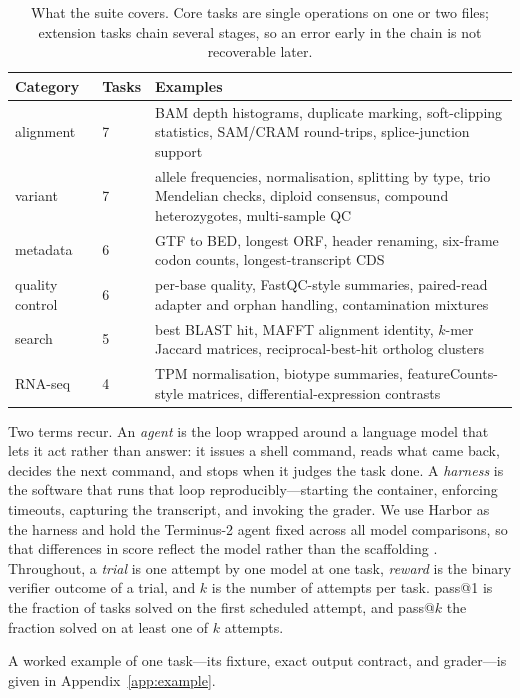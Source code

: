 \documentclass[11pt]{article}
\begin{document}
\begin{table}[tbp]
\centering
\small
\caption{What the suite covers. Core tasks are single operations on one or two files; extension tasks chain several stages, so an error early in the chain is not recoverable later.}
\label{tab:categories}
\begin{tabular}{llp{7.6cm}}
\toprule
Category & Tasks & Examples \\
\midrule
alignment & 7 & BAM depth histograms, duplicate marking, soft-clipping statistics, SAM/CRAM round-trips, splice-junction support \\
variant & 7 & allele frequencies, normalisation, splitting by type, trio Mendelian checks, diploid consensus, compound heterozygotes, multi-sample QC \\
metadata & 6 & GTF to BED, longest ORF, header renaming, six-frame codon counts, longest-transcript CDS \\
quality control & 6 & per-base quality, FastQC-style summaries, paired-read adapter and orphan handling, contamination mixtures \\
search & 5 & best BLAST hit, MAFFT alignment identity, $k$-mer Jaccard matrices, reciprocal-best-hit ortholog clusters \\
RNA-seq & 4 & TPM normalisation, biotype summaries, featureCounts-style matrices, differential-expression contrasts \\
\bottomrule
\end{tabular}
\end{table}

Two terms recur.
An \emph{agent} is the loop wrapped around a language model that lets it act rather than answer: it issues a shell command, reads what came back, decides the next command, and stops when it judges the task done.
A \emph{harness} is the software that runs that loop reproducibly---starting the container, enforcing timeouts, capturing the transcript, and invoking the grader.
We use Harbor as the harness and hold the Terminus-2 agent fixed across all model comparisons, so that differences in score reflect the model rather than the scaffolding \citep{harbor2026}.
Throughout, a \emph{trial} is one attempt by one model at one task, \emph{reward} is the binary verifier outcome of a trial, and $k$ is the number of attempts per task.
pass@1 is the fraction of tasks solved on the first scheduled attempt, and pass@$k$ the fraction solved on at least one of $k$ attempts.

A worked example of one task---its fixture, exact output contract, and grader---is given in Appendix~\ref{app:example}.
\end{document}
